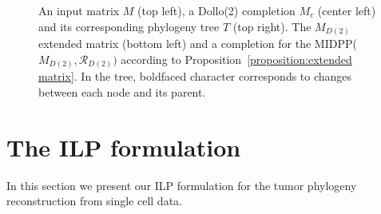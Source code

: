 \documentclass[a4paper,USenglish]{article}
\theoremstyle{definition}
\begin{document}
\begin{figure}[tb!]
  \begin{minipage}{.5\linewidth}
  \end{minipage}
  \begin{minipage}{.5\linewidth}
  \end{minipage}

  \caption{An input matrix $M$ (top left), a Dollo(2) completion $M_c$ (center
  left) and its corresponding phylogeny tree $T$ (top right). 
  The $M_{D(2)}$ extended matrix (bottom left) 
  and a completion for the MIDPP($M_{D(2)},\mathcal R_{D(2)})$
  according to Proposition~\ref{proposition:extended matrix}.
%
  In the tree, boldfaced character corresponds to changes between each
  node and its parent.  }
\label{fig:M_e}
\end{figure}

\section{The ILP formulation}
\label{sec:ilp}
In this section we present our ILP formulation for the tumor phylogeny
reconstruction from single cell data.
\end{document}
